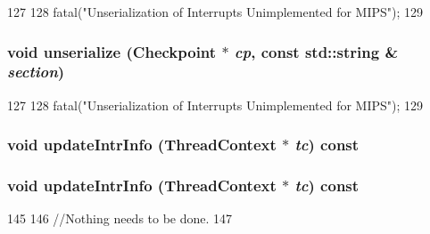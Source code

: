 \begin{DoxyCode}
127     {
128         fatal("Unserialization of Interrupts Unimplemented for MIPS");
129     }
\end{DoxyCode}
\hypertarget{classMipsISA_1_1Interrupts_af22e5d6d660b97db37003ac61ac4ee49}{
\subsubsection[{unserialize}]{\setlength{\rightskip}{0pt plus 5cm}void unserialize ({\bf Checkpoint} $\ast$ {\em cp}, \/  const std::string \& {\em section})}}
\label{classMipsISA_1_1Interrupts_af22e5d6d660b97db37003ac61ac4ee49}



\begin{DoxyCode}
127     {
128         fatal("Unserialization of Interrupts Unimplemented for MIPS");
129     }
\end{DoxyCode}
\hypertarget{classMipsISA_1_1Interrupts_ad92c743dd73ba955adb1aaa2d9135fb7}{
\subsubsection[{updateIntrInfo}]{\setlength{\rightskip}{0pt plus 5cm}void updateIntrInfo ({\bf ThreadContext} $\ast$ {\em tc}) const}}
\label{classMipsISA_1_1Interrupts_ad92c743dd73ba955adb1aaa2d9135fb7}
\hypertarget{classMipsISA_1_1Interrupts_ad92c743dd73ba955adb1aaa2d9135fb7}{
\subsubsection[{updateIntrInfo}]{\setlength{\rightskip}{0pt plus 5cm}void updateIntrInfo ({\bf ThreadContext} $\ast$ {\em tc}) const}}
\label{classMipsISA_1_1Interrupts_ad92c743dd73ba955adb1aaa2d9135fb7}



\begin{DoxyCode}
145 {
146     //Nothing needs to be done.
147 }
\end{DoxyCode}


